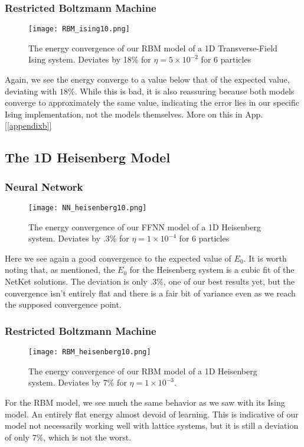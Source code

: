 \documentclass[12pt]{article}
\begin{document}
{\subsubsection*{Restricted Boltzmann Machine}
\begin{figure}[ht!]
    \centering
    \texttt{[image: RBM\_ising10.png]}
    \caption{The energy convergence of our RBM model of a 1D Transverse-Field Ising system. Deviates by 18\% for $\eta = 5 \times 10^{-2}$ for 6 particles}
    \label{fig:RBMtfi}
\end{figure}
Again, we see the energy converge to a value below that of the expected value, deviating with $18\%$. While this is bad, it is also reassuring because both models converge to approximately the same value, indicating the error lies in our specific Ising implementation, not the models themselves. More on this in App. [\ref{appendixb}]
\newpage
\subsection{The 1D Heisenberg Model}
\subsubsection*{Neural Network}
\begin{figure}[ht!]
    \centering
    \texttt{[image: NN\_heisenberg10.png]}
    \caption{The energy convergence of our FFNN model of a 1D Heisenberg system. Deviates by .3\% for $\eta = 1 \times 10^{-4}$ for 6 particles}
    \label{fig:NNhb}
\end{figure}
Here we see again a good convergence to the expected value of $E_0$. It is worth noting that, as mentioned, the $E_0$ for the Heisenberg system is a cubic fit of the NetKet solutions. The deviation is only $.3\%$, one of our best results yet, but the convergence isn't entirely flat and there is a fair bit of variance even as we reach the supposed convergence point.
\newpage
\subsubsection*{Restricted Boltzmann Machine}
\begin{figure}[ht!]
    \centering
    \texttt{[image: RBM\_heisenberg10.png]}
    \caption{The energy convergence of our RBM model of a 1D Heisenberg system. Deviates by 7\% for $\eta = 1 \times 10^{-3}$.}
    \label{fig:RBMhb}
\end{figure}
For the RBM model, we see much the same behavior as we saw with its Ising model. An entirely flat energy almost devoid of learning. This is indicative of our model not necessarily working well with lattice systems, but it is still a deviation of only $7\%$, which is not the worst.
\newpage
}
\end{document}
